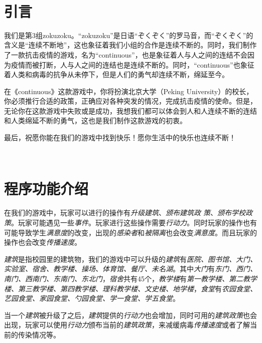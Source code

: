 \documentclass[hyperref,a4paper,UTF8]{ctexart}
\begin{document}
\newpage

\

\tableofcontents


\newpage


\section{引言}

我们是第3组zokuzoku。“zokuzoku”是日语“ぞくぞく”的罗马音，而“ぞくぞく”的含义是“连续不断地”，这也象征着我们小组的合作是连续不断的。同时，我们制作了一款抗击疫情的游戏，名为“continuous”，也是象征着人与人之间的连结不会因为疫情而被打断，人与人之间的连结也是连续不断的。同时，“continuous”也象征着人类和病毒的抗争从未停下，但是人们的勇气却连续不断，绵延至今。

在《continuous》这款游戏中，你将扮演北京大学（Peking University）的校长，你必须推行合适的政策，正确应对各种突发的情况，完成抗击疫情的使命。但是，无论你在这款游戏中失败或是成功，我想我们都可以体会到人和人连续不断的连结和人类绵延不断的勇气，这也是我们制作这款游戏的初衷。

最后，祝愿你能在我们的游戏中找到快乐！愿你生活中的快乐也连续不断！

\

\section{程序功能介绍}

在我们的游戏中，玩家可以进行的操作有\textit{升级建筑}、\textit{颁布建筑政
策}、\textit{颁布学校政策}。玩家可能遇见一些\textit{事件}。玩家进行这些操作需要\textit{行动力}。同时玩家的操作也有可能导致学生\textit{满意度}的改变，出现的\textit{感染者}和\textit{被隔离}也会改变\textit{满意度}。而且玩家的操作也会改变\textit{传播速度}。

\textit{建筑}是指校园里的建筑物，我们的游戏中可以升级的\textit{建筑}有\textit{医院、图书馆、大门、实验室、宿舍、教学楼、操场、体育馆、餐厅、未名湖}。其中\textit{大门}有\textit{东门、西门、南门、西南门、东南门、东北门}，\textit{宿舍}共有45个，\textit{教学楼}有\textit{第一教学楼、第二教学楼、第三教学楼、第四教学楼、理科教学楼、文史楼、地学楼}，\textit{食堂}有\textit{农园食堂、艺园食堂、家园食堂、勺园食堂、学一食堂、学五食堂}。

当一个\textit{建筑}被升级了之后，\textit{建筑}提供的\textit{行动力}也会增加，同时可用的\textit{建筑政策}也会出现，玩家可以使用\textit{行动力}颁布当前的\textit{建筑政策}，来减缓病毒\textit{传播速度}或者了解当前的传染情况等。
\end{document}
